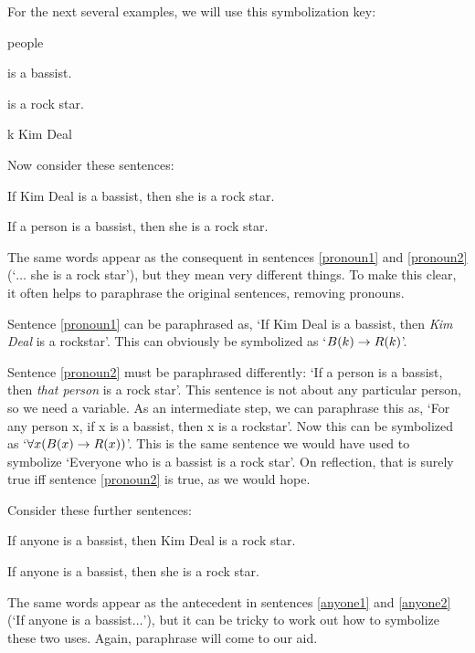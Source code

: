 For the next several examples, we will use this symbolization key:
	\begin{ekey}
		\item[\text{domain}] people
		\item[\atom{B}{x}]  is a bassist.
		\item[\atom{R}{x}]  is a rock star.
		\item[k] Kim Deal
	\end{ekey}
Now consider these sentences:
	\begin{earg}
		\item[\ex{pronoun1}] If Kim Deal is a bassist, then she is a rock star.
		\item[\ex{pronoun2}] If a person is a bassist, then she is a rock star.
	\end{earg}
The same words appear as the consequent in sentences \ref{pronoun1} and \ref{pronoun2} (`$\ldots$ she is a rock star'), but they mean very different things. To make this clear, it often helps to paraphrase the original sentences, removing pronouns.

Sentence \ref{pronoun1} can be paraphrased as, `If Kim Deal is a bassist, then \emph{Kim Deal} is a rockstar'. This can obviously be symbolized as `$\mathord{B}(k) \rightarrow \mathord{R}(k)$'.

Sentence \ref{pronoun2} must be paraphrased differently: `If a person is a bassist, then \emph{that person} is a rock star'. This sentence is not about any particular person, so we need a variable. As an intermediate step, we can paraphrase this as, `For any person x, if x is a bassist, then x is a rockstar'. Now this can be symbolized as `$\forall x (\mathord{B}(x) \rightarrow \mathord{R}(x))$'. This is the same sentence we would have used to symbolize `Everyone who is a bassist is a rock star'. On reflection, that is surely true iff sentence \ref{pronoun2} is true, as we would hope.

Consider these further sentences:
	\begin{earg}
		\item[\ex{anyone1}] If anyone is a bassist, then Kim Deal is a rock star.
		\item[\ex{anyone2}] If anyone is a bassist, then she is a rock star.
	\end{earg}
The same words appear as the antecedent in sentences \ref{anyone1} and \ref{anyone2}  (`If anyone is a bassist$\ldots$'), but it can be tricky to work out how to symbolize these two uses. Again, paraphrase will come to our aid. 

